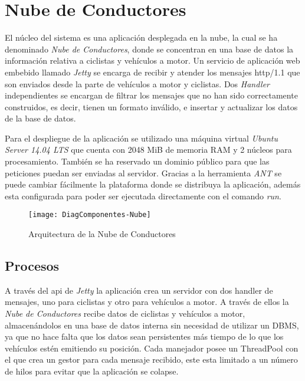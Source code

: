 \section{Nube de Conductores}\label{section:NubeConductores}
El núcleo del sistema es una aplicación desplegada en la nube, la cual se ha
denominado \emph{Nube de Conductores}, donde se concentran en una base de datos
la información relativa a ciclistas y vehículos a motor. Un servicio de aplicación
web embebido llamado \emph{Jetty} se encarga de recibir y atender los mensajes
\Gls{http/1.1} que son enviados desde la parte de vehículos a motor y ciclistas.
Dos \emph{Handler} independientes se encargan de filtrar los mensajes que no han
sido correctamente construidos, es decir, tienen un formato inválido, e insertar
y actualizar los datos de la base de datos.

Para el despliegue de la aplicación se utilizado una máquina virtual \emph{Ubuntu Server
14.04 LTS} que cuenta con 2048 MiB de memoria RAM y 2 n\'ucleos para procesamiento.
También se ha reservado un dominio público para que las peticiones puedan ser enviadas
al servidor. Gracias a la herramienta \emph{ANT} se puede cambiar fácilmente la plataforma
donde se distribuya la aplicación, además esta configurada para poder ser ejecutada
directamente con el comando \emph{run}.

\begin{figure}[H]
	\begin{center}
		\texttt{[image: DiagComponentes-Nube]}
		\caption{Arquitectura de la Nube de Conductores}
		\label{fig:DiagComponentes-Nube}
	\end{center}
\end{figure}

\subsection{Procesos}\label{ssection:procesos}
A través del \gls{api} de \emph{Jetty} la aplicación crea un servidor con dos handler
de mensajes, uno para ciclistas y otro para vehículos a motor. A través de ellos la
\emph{Nube de Conductores} recibe datos de ciclistas y vehículos a motor, almacenándolos
en una base de datos interna sin necesidad de utilizar un DBMS, ya que no hace falta
que los datos sean persistentes más tiempo de lo que los vehículos estén emitiendo
su posición. Cada manejador posee un ThreadPool con el que crea un gestor para cada
mensaje recibido, este esta limitado a un número de hilos para evitar que la aplicación
se colapse.

